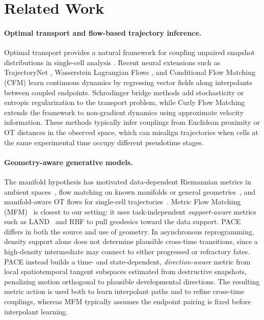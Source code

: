 \section{Related Work}
\label{sec:related}

\paragraph{Optimal transport and flow-based trajectory inference.}
Optimal transport provides a natural framework for coupling unpaired snapshot distributions in single-cell analysis \citep{schiebinger2019optimal,lavenant2021towards}. Recent neural extensions such as TrajectoryNet \citep{tong2020trajectorynet}, Wasserstein Lagrangian Flows \citep{neklyudov2023action}, and Conditional Flow Matching (CFM) \citep{tong2023conditional, lipman2023flow} learn continuous dynamics by regressing vector fields along interpolants between coupled endpoints. Schrodinger bridge methods \citep{debortoli2021diffusion,shi2023diffusion,chen2023deep} add stochasticity or entropic regularization to the transport problem, while Curly Flow Matching \citep{petrovic2026curly} extends the framework to non-gradient dynamics using approximate velocity information. These methods typically infer couplings from Euclidean proximity or OT distances in the observed space, which can misalign trajectories when cells at the same experimental time occupy different pseudotime stages.

\paragraph{Geometry-aware generative models.}
The manifold hypothesis has motivated data-dependent Riemannian metrics in ambient spaces~\citep{hauberg2012geometric,arvanitidis2017latent}, flow matching on known manifolds or general geometries~\citep{chen2024flow}, and manifold-aware OT flows for single-cell trajectories~\citep{huguet2022manifold}.
Metric Flow Matching (MFM)~\citep{kapusniak2024metric} is closest to our setting: it uses task-independent \emph{support-aware} metrics such as LAND~\citep{arvanitidis2017latent} and RBF to pull geodesics toward the data support.
PACE differs in both the source and use of geometry.
In asynchronous reprogramming, density support alone does not determine plausible cross-time transitions, %
since a high-density intermediate may connect to either progressed or refractory fates.
PACE instead builds a time- and state-dependent, \emph{direction-aware} metric from local spatiotemporal tangent subspaces estimated from destructive snapshots, penalizing motion orthogonal to plausible developmental directions.
The resulting metric action is used both to learn interpolant paths and to refine cross-time couplings, whereas MFM typically assumes the endpoint pairing is fixed before interpolant learning.







